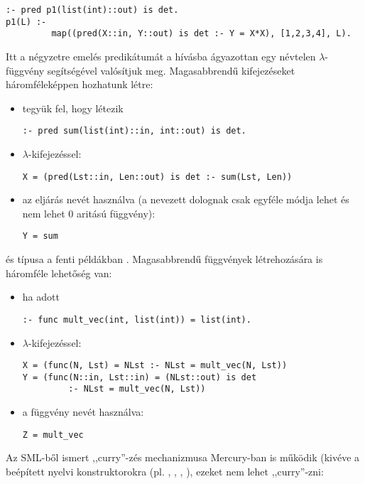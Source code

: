 \begin{verbatim} 
:- pred p1(list(int)::out) is det.
p1(L) :-
         map((pred(X::in, Y::out) is det :- Y = X*X), [1,2,3,4], L).
\end{verbatim}

Itt a négyzetre emelés predikátumát a  hívásba ágyazottan egy névtelen
$\lambda$-függvény segítségével valósítjuk meg.
\br
Magasabbrendű kifejezéseket háromféleképpen hozhatunk létre:

\begin{itemize}
\item tegyük fel, hogy létezik
\begin{verbatim}
:- pred sum(list(int)::in, int::out) is det.
\end{verbatim}
\item $\lambda$-kifejezéssel:
\begin{verbatim}
X = (pred(Lst::in, Len::out) is det :- sum(Lst, Len))
\end{verbatim}
\item az eljárás nevét használva (a nevezett dolognak csak egyféle módja lehet
és nem lehet 0 aritású függvény):
\begin{verbatim}
Y = sum
\end{verbatim}
\end{itemize}

 és  típusa a fenti példákban .
\br
Magasabbrendű függvények létrehozására is háromféle lehetőség van:

\begin{itemize}
\item ha adott
\begin{verbatim}
:- func mult_vec(int, list(int)) = list(int).
\end{verbatim}
\item $\lambda$-kifejezéssel:
\begin{verbatim}
X = (func(N, Lst) = NLst :- NLst = mult_vec(N, Lst))
Y = (func(N::in, Lst::in) = (NLst::out) is det
         :- NLst = mult_vec(N, Lst))
\end{verbatim}
\item a függvény nevét használva:
\begin{verbatim}
Z = mult_vec
\end{verbatim}
\end{itemize}


Az SML-ből ismert ,,curry''-zés mechanizmusa Mercury-ban is működik (kivéve
a beépített nyelvi konstruktorokra (pl. \cd{=}, \cd{\bs=}, , ),
ezeket nem lehet ,,curry''-zni:

